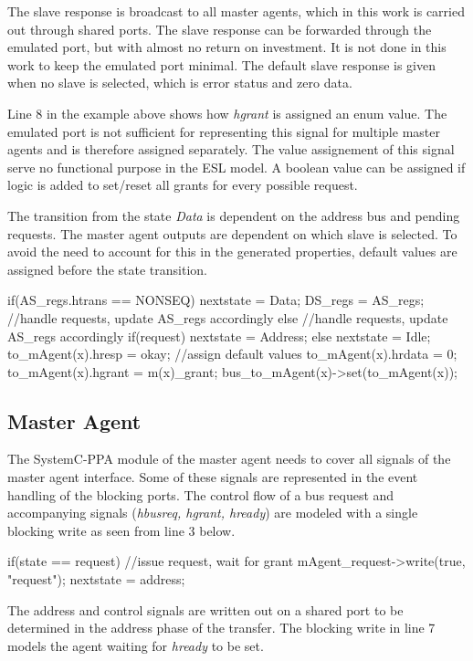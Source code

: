 The slave response is broadcast to all master agents, which in this work is carried out through shared ports. The slave response can be forwarded through the emulated port, but with almost no return on investment. It is not done in this work to keep the emulated port minimal. The default slave response is given when no slave is selected, which is error status and zero data. \par
Line 8 in the example above shows how \textit{hgrant} is assigned an enum value. The emulated port is not sufficient for representing this signal for multiple master agents and is therefore assigned separately. The value assignement of this signal serve no functional purpose in the ESL model. A boolean value can be assigned if logic is added to set/reset all grants for every possible request.  \par
The transition from the state \textit{Data} is dependent on the address bus and pending requests. The master agent outputs are dependent on which slave is selected. To avoid the need to account for this in the generated properties, default values are assigned before the state transition.   
\begin{C++}
if(AS_regs.htrans == NONSEQ){ 
 nextstate = Data;
 DS_regs = AS_regs;
 //handle requests, update AS_regs accordingly
}else{
 //handle requests, update AS_regs accordingly
 if(request) nextstate = Address;
 else nextstate = Idle;
}
to_mAgent(x).hresp = okay; //assign default values
to_mAgent(x).hrdata = 0;
to_mAgent(x).hgrant = m(x)_grant;
bus_to_mAgent(x)->set(to_mAgent(x));

\end{C++}

 

\subsection{Master Agent}
The SystemC-PPA module of the master agent needs to cover all signals of the master agent interface. Some of these signals are represented in the event handling of the blocking ports. The control flow of a bus request and accompanying signals (\textit{hbusreq, hgrant, hready}) are modeled with a single blocking write as seen from line 3 below. 
\begin{C++}
if(state == request){
  //issue request, wait for grant
  mAgent_request->write(true, "request"); 
  nextstate = address;
}
\end{C++}

The address and control signals are written out on a shared port to be determined in the address phase of the transfer. The blocking write in line 7 models the agent waiting for \textit{hready} to be set. 

